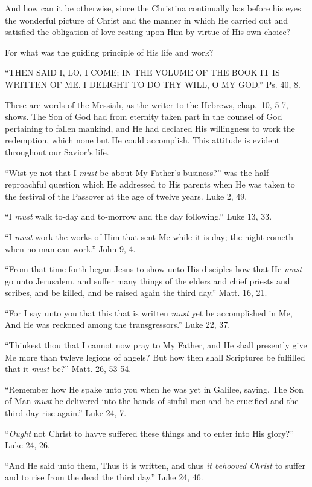 \documentclass[
]{book}
\begin{document}
And how can it be otherwise, since the Christina continually has before his eyes the wonderful picture of Christ and the manner in which He carried out and satisfied the obligation of love resting upon Him by virtue of His own choice?

For what was the guiding principle of His life and work?

``THEN SAID I, LO, I COME; IN THE VOLUME OF THE BOOK IT IS WRITTEN OF ME. I DELIGHT TO DO THY WILL, O MY GOD.'' Ps. 40, 8.

These are words of the Messiah, as the writer to the Hebrews, chap.~10, 5-7, shows. The Son of God had from eternity taken part in the counsel of God pertaining to fallen mankind, and He had declared His willingness to work the redemption, which none but He could accomplish. This attitude is evident throughout our Savior's life.

``Wist ye not that I \emph{must} be about My Father's business?'' was the half-reproachful question which He addressed to His parents when He was taken to the festival of the Passover at the age of twelve years. Luke 2, 49.

``I \emph{must} walk to-day and to-morrow and the day following.'' Luke 13, 33.

``I \emph{must} work the works of Him that sent Me while it is day; the night cometh when no man can work.'' John 9, 4.

``From that time forth began Jesus to show unto His disciples how that He \emph{must} go unto Jerusalem, and suffer many things of the elders and chief priests and scribes, and be killed, and be raised again the third day.'' Matt. 16, 21.

``For I say unto you that this that is written \emph{must} yet be accomplished in Me, And He was reckoned among the transgressors.'' Luke 22, 37.

``Thinkest thou that I cannot now pray to My Father, and He shall presently give Me more than twleve legions of angels? But how then shall Scriptures be fulfilled that it \emph{must} be?'' Matt. 26, 53-54.

``Remember how He spake unto you when he was yet in Galilee, saying, The Son of Man \emph{must} be delivered into the hands of sinful men and be crucified and the third day rise again.'' Luke 24, 7.

``\emph{Ought} not Christ to havve suffered these things and to enter into His glory?'' Luke 24, 26.

``And He said unto them, Thus it is written, and thus \emph{it behooved Christ} to suffer and to rise from the dead the third day.'' Luke 24, 46.
\end{document}
